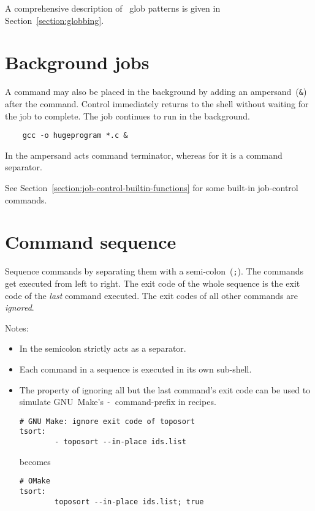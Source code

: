 A comprehensive description of \OMake~glob patterns is given in Section~\ref{section:globbing}.

\section{Background jobs}

A command may also be placed in the background by adding an ampersand~(\verb+&+) after the command.
Control immediately returns to the shell without waiting for the job to complete.  The job continues
to run in the background.

\begin{verbatim}
    gcc -o hugeprogram *.c &
\end{verbatim}

In  the ampersand acts command terminator, whereas for  it is a command
separator.

See Section~\ref{section:job-control-builtin-functions} for some built-in job-control commands.

\section{Command sequence}\label{section:command-sequence}

Sequence commands by separating them with a semi-colon~(\verb+;+).  The commands get executed from
left to right.  The exit code of the whole sequence is the exit code of the \emph{last} command
executed.  The exit codes of all other commands are \emph{ignored}.

Notes:

\begin{itemize}
  \item In  the semicolon strictly acts as a separator.
  \item Each command in a sequence is executed in its own sub-shell.
  \item The property of ignoring all but the last command's exit code can be used to simulate
    GNU~Make's \verb+-+~command-prefix in recipes.
\begin{verbatim}
# GNU Make: ignore exit code of toposort
tsort:
        - toposort --in-place ids.list
\end{verbatim}
    becomes
\begin{verbatim}
# OMake
tsort:
        toposort --in-place ids.list; true
\end{verbatim}
\end{itemize}

